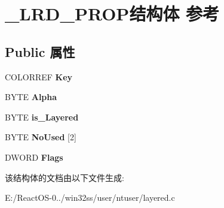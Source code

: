 \hypertarget{struct___l_r_d___p_r_o_p}{}\section{\+\_\+\+L\+R\+D\+\_\+\+P\+R\+O\+P结构体 参考}
\label{struct___l_r_d___p_r_o_p}
\subsection*{Public 属性}
\begin{DoxyCompactItemize}
\item 
\mbox{\label{struct___l_r_d___p_r_o_p_ad648e686730a94498443523204a267cf}} 
C\+O\+L\+O\+R\+R\+EF {\bfseries Key}
\item 
\mbox{\label{struct___l_r_d___p_r_o_p_a8fd95f96833faa6c8d1a7450f7516007}} 
B\+Y\+TE {\bfseries Alpha}
\item 
\mbox{\label{struct___l_r_d___p_r_o_p_a230977e8134dc1b7f88f362d7f65e5b1}} 
B\+Y\+TE {\bfseries is\+\_\+\+Layered}
\item 
\mbox{\label{struct___l_r_d___p_r_o_p_a971fafc81fa24e5fe6159fc11bf022e8}} 
B\+Y\+TE {\bfseries No\+Used} \mbox{[}2\mbox{]}
\item 
\mbox{\label{struct___l_r_d___p_r_o_p_a4ff001f5abd4036faf02067e2fd934e9}} 
D\+W\+O\+RD {\bfseries Flags}
\end{DoxyCompactItemize}


该结构体的文档由以下文件生成\+:\begin{DoxyCompactItemize}
\item 
E\+:/\+React\+O\+S-\/0../win32ss/user/ntuser/layered.\+c\end{DoxyCompactItemize}
